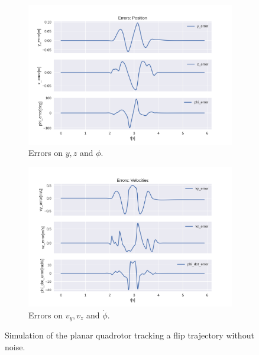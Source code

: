 \documentclass{thesisreport}
\begin{document}
\begin{figure}[H]
\medskip
	\begin{subfigure}{0.48\textwidth}
		\includegraphics[width=\linewidth]{Images/acados_simulations/flip_trajectory/planar_quadrotor/noiseless/Errors_position.png}
		\caption{Errors on $y,z$ and $\phi$.} \label{fig:flip_planar_sim_error_pose_noiseless}
	\end{subfigure}\hspace*{\fill}
	\begin{subfigure}{0.48\textwidth}
		\includegraphics[width=\linewidth]{Images/acados_simulations/flip_trajectory/planar_quadrotor/noiseless/Errors_velocities.png}
		\caption{Errors on $v_y,v_z$ and $\dot{\phi}$.} \label{fig:flip_planar_sim_error_velocities_noiseless}
	\end{subfigure}

	\caption{Simulation of the planar quadrotor tracking a flip trajectory without noise.} \label{fig:flip_planar_sim_noiseless}
\end{figure}
\end{document}
